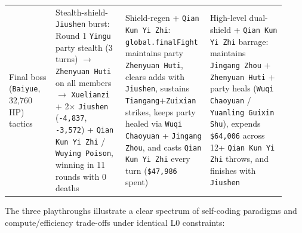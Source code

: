 \documentclass[11pt,a4paper]{article}
\begin{document}
{\begin{longtable}{@{}>{\RaggedRight\arraybackslash}p{0.16\linewidth}>{\RaggedRight\arraybackslash}p{0.24\linewidth}>{\RaggedRight\arraybackslash}p{0.26\linewidth}>{\RaggedRight\arraybackslash}p{0.26\linewidth}@{}}
Final boss (\texttt{Baiyue}, 32,760 HP) tactics & Stealth-shield-\texttt{Jiushen} burst: Round 1 \texttt{Yingu} party stealth (3 turns) \ensuremath{\rightarrow} \texttt{Zhenyuan\allowbreak{} \allowbreak{}Huti} on all members \ensuremath{\rightarrow} \texttt{Xuelianzi} + 2\ensuremath{\times} \texttt{Jiushen} (\texttt{-\allowbreak{}4\allowbreak{},\allowbreak{}837}, \texttt{-\allowbreak{}3\allowbreak{},\allowbreak{}572}) + \texttt{Qian\allowbreak{} \allowbreak{}Kun\allowbreak{} \allowbreak{}Yi\allowbreak{} \allowbreak{}Zhi} / \texttt{Wuying\allowbreak{} \allowbreak{}Poison}, winning in 11 rounds with 0 deaths & Shield-regen + \texttt{Qian\allowbreak{} \allowbreak{}Kun\allowbreak{} \allowbreak{}Yi\allowbreak{} \allowbreak{}Zhi}: \texttt{global\allowbreak{}.\allowbreak{}finalFight} maintains party \texttt{Zhenyuan\allowbreak{} \allowbreak{}Huti}, clears adds with \texttt{Jiushen}, sustains \texttt{Tiangang}+\texttt{Zuixian} strikes, keeps party healed via \texttt{Wuqi\allowbreak{} \allowbreak{}Chaoyuan} + \texttt{Jingang\allowbreak{} \allowbreak{}Zhou}, and casts \texttt{Qian\allowbreak{} \allowbreak{}Kun\allowbreak{} \allowbreak{}Yi\allowbreak{} \allowbreak{}Zhi} every turn (\texttt{\$47\allowbreak{},\allowbreak{}986} spent) & High-level dual-shield + \texttt{Qian\allowbreak{} \allowbreak{}Kun\allowbreak{} \allowbreak{}Yi\allowbreak{} \allowbreak{}Zhi} barrage: maintains \texttt{Jingang\allowbreak{} \allowbreak{}Zhou} + \texttt{Zhenyuan\allowbreak{} \allowbreak{}Huti} + party heals (\texttt{Wuqi\allowbreak{} \allowbreak{}Chaoyuan} / \texttt{Yuanling\allowbreak{} \allowbreak{}Guixin\allowbreak{} \allowbreak{}Shu}), expends \texttt{\$64\allowbreak{},\allowbreak{}006} across 12+ \texttt{Qian\allowbreak{} \allowbreak{}Kun\allowbreak{} \allowbreak{}Yi\allowbreak{} \allowbreak{}Zhi} throws, and finishes with \texttt{Jiushen} \\
\end{longtable}
}

The three playthroughs illustrate a clear spectrum of self-coding paradigms and compute/efficiency trade-offs under identical L0 constraints:
\end{document}

